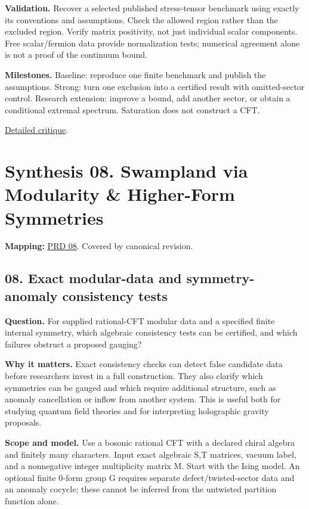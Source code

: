 \documentclass[
  11pt,
]{article}
\begin{document}
\textbf{Validation.} Recover a selected published stress-tensor
benchmark using exactly its conventions and assumptions. Check the
allowed region rather than the excluded region. Verify matrix
positivity, not just individual scalar components. Free scalar/fermion
data provide normalization tests; numerical agreement alone is not a
proof of the continuum bound.

\textbf{Milestones.} Baseline: reproduce one finite benchmark and
publish the assumptions. Strong: turn one exclusion into a certified
result with omitted-sector control. Research extension: improve a bound,
add another sector, or obtain a conditional extremal spectrum.
Saturation does not construct a CFT.

\href{https://github.com/rick-stevens-ai/Pure-Thought/blob/main/reviews/07-Extremal-CFTs-Stress-Tensor.md}{Detailed
critique}.

\section{Synthesis 08. Swampland via Modularity \& Higher-Form
Symmetries}

\textbf{Mapping:}
\href{https://github.com/rick-stevens-ai/Pure-Thought/blob/main/PRDs/08-Swampland-Modularity-Symmetries.md}{PRD
08}. Covered by canonical revision.

\subsection{08. Exact modular-data and symmetry-anomaly consistency
tests}

\textbf{Question.} For supplied rational-CFT modular data and a
specified finite internal symmetry, which algebraic consistency tests
can be certified, and which failures obstruct a proposed gauging?

\textbf{Why it matters.} Exact consistency checks can detect false
candidate data before researchers invest in a full construction. They
also clarify which symmetries can be gauged and which require additional
structure, such as anomaly cancellation or inflow from another system.
This is useful both for studying quantum field theories and for
interpreting holographic gravity proposals.

\textbf{Scope and model.} Use a bosonic rational CFT with a declared
chiral algebra and finitely many characters. Input exact algebraic S,T
matrices, vacuum label, and a nonnegative integer multiplicity matrix M.
Start with the Ising model. An optional finite 0-form group G requires
separate defect/twisted-sector data and an anomaly cocycle; these cannot
be inferred from the untwisted partition function alone.
\end{document}
